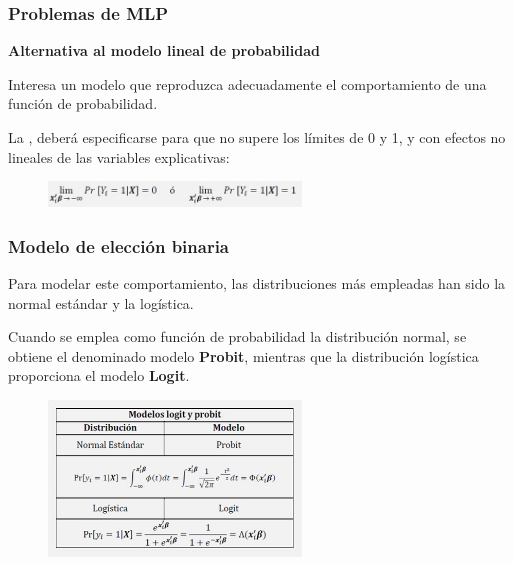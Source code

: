 \documentclass[10pt]{beamer}
\begin{document}
\begin{frame}
\frametitle{Problemas de MLP}


\textbf{Alternativa al modelo lineal de probabilidad}

\vspace{4mm}

Interesa un modelo que reproduzca adecuadamente el comportamiento de una función de probabilidad. 

\vspace{4mm}

La , deberá especificarse para que no supere los límites de 0 y 1, y con efectos no lineales de las variables explicativas: 


\begin{figure}
\begin{center}
    \includegraphics[width=0.6\textwidth]{9_3.JPG}
\end{center}
\end{figure}


\end{frame}







\begin{frame}
\frametitle{Modelo de elección binaria}


Para modelar este comportamiento, las distribuciones más empleadas han sido la normal estándar y la logística. 

\vspace{4mm}

Cuando se emplea como función de probabilidad la distribución normal, se obtiene el denominado modelo \textbf{Probit}, mientras que la distribución logística proporciona el modelo \textbf{Logit}. 

\begin{figure}
\begin{center}
    \includegraphics[width=0.6\textwidth]{9_4.JPG}
\end{center}
\end{figure}


\end{frame}
\end{document}
